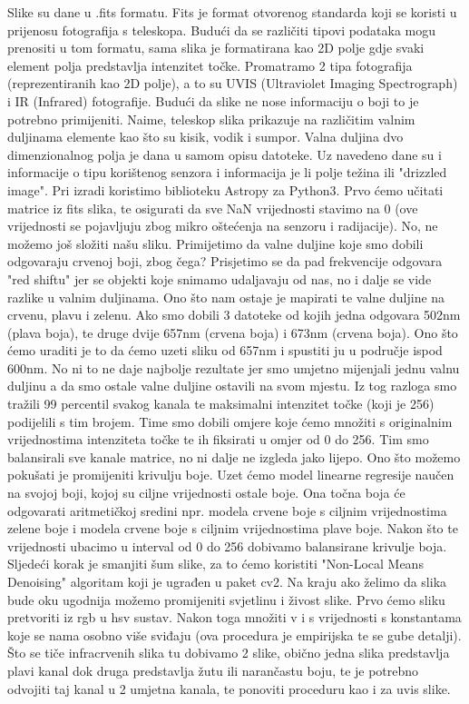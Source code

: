 \documentclass[conference]{IEEEtran}
\begin{document}
Slike su dane u .fits formatu. Fits je format otvorenog standarda koji se koristi u prijenosu fotografija s teleskopa. Budući da se različiti tipovi podataka mogu prenositi u tom formatu, sama slika je formatirana kao 2D polje gdje svaki element polja predstavlja intenzitet točke. Promatramo 2 tipa fotografija (reprezentiranih kao 2D polje), a to su UVIS (Ultraviolet Imaging Spectrograph) i IR (Infrared) fotografije. Budući da slike ne nose informaciju o boji to je potrebno primijeniti. Naime, teleskop slika prikazuje na različitim valnim duljinama elemente kao što su kisik, vodik i sumpor. Valna duljina dvo dimenzionalnog polja je dana u samom opisu datoteke. Uz navedeno dane su i informacije o tipu korištenog senzora i informacija je li polje težina ili "drizzled image". Pri izradi koristimo biblioteku Astropy za Python3. Prvo ćemo učitati matrice iz fits slika, te osigurati da sve NaN vrijednosti stavimo na 0 (ove vrijednosti se pojavljuju zbog mikro oštećenja na senzoru i radijacije). No, ne možemo još složiti našu sliku. Primijetimo da valne duljine koje smo dobili odgovaraju crvenoj boji, zbog čega? Prisjetimo se da pad frekvencije odgovara "red shiftu" jer se objekti koje snimamo udaljavaju od nas, no i dalje se vide razlike u valnim duljinama. Ono što nam ostaje je mapirati te valne duljine na crvenu, plavu i zelenu. Ako smo dobili 3 datoteke od kojih jedna odgovara 502nm (plava boja), te druge dvije 657nm (crvena boja) i 673nm (crvena boja). Ono što ćemo uraditi je to da ćemo uzeti sliku od 657nm i spustiti ju u područje ispod 600nm. No ni to ne daje najbolje rezultate jer smo umjetno mijenjali jednu valnu duljinu a da smo ostale valne duljine ostavili na svom mjestu. Iz tog razloga smo tražili 99 percentil svakog kanala te maksimalni intenzitet točke (koji je 256) podijelili s tim brojem. Time smo dobili omjere koje ćemo množiti s originalnim vrijednostima intenziteta točke te ih fiksirati u omjer od 0 do 256. Tim smo balansirali sve kanale matrice, no ni dalje ne izgleda jako lijepo. Ono što možemo pokušati je promijeniti krivulju boje. Uzet ćemo model linearne regresije naučen na svojoj boji, kojoj su ciljne vrijednosti ostale boje. Ona točna boja će odgovarati aritmetičkoj sredini npr. modela crvene boje s ciljnim vrijednostima zelene boje i modela crvene boje s ciljnim vrijednostima plave boje. Nakon što te vrijednosti ubacimo u interval od 0 do 256 dobivamo balansirane krivulje boja. Sljedeći korak je smanjiti šum slike, za to ćemo koristiti "Non-Local Means Denoising" algoritam koji je ugrađen u paket cv2. Na kraju ako želimo da slika bude oku ugodnija možemo promijeniti svjetlinu i živost slike. Prvo ćemo sliku pretvoriti iz rgb u hsv sustav. Nakon toga množiti v i s vrijednosti s konstantama koje se nama osobno više sviđaju (ova procedura je empirijska te se gube detalji). Što se tiče infracrvenih slika tu dobivamo 2 slike, obično jedna slika predstavlja plavi kanal dok druga predstavlja žutu ili narančastu boju, te je potrebno odvojiti taj kanal u 2 umjetna kanala, te ponoviti proceduru kao i za uvis slike.
\end{document}
